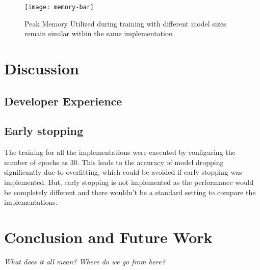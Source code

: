 \begin{figure}[ht]
	\centering
	\texttt{[image: memory-bar]}
	\caption[Peak Memory Utilisation]{Peak Memory Utilized during training with different model sizes remain similar within the same implementation}
\end{figure}

\chapter{Discussion}

\section{Developer Experience}

\section{Early stopping}
The training for all the implementations were executed by configuring the number of epochs as 30. This leads to the accuracy of model dropping significantly due to overfitting, which could be avoided if early stopping was implemented.
But, early stopping is not implemented as the performance would be completely different and there wouldn't be a standard setting to compare the implementations.

\chapter{Conclusion and Future Work}
\textit{What does it all mean? Where do we go from here?}
